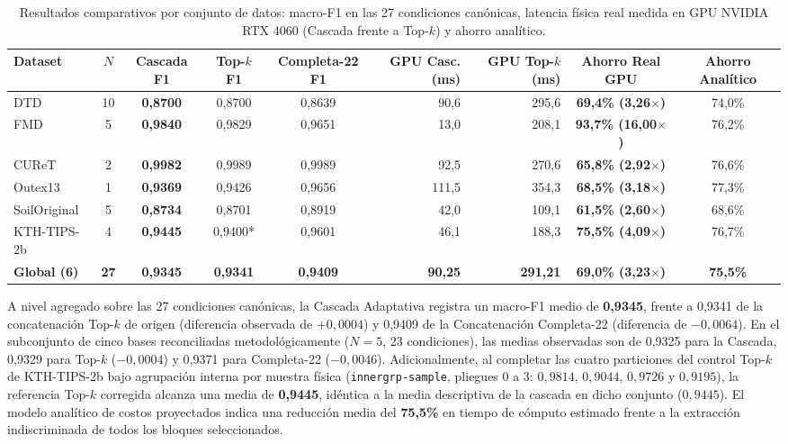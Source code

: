 \begin{table}[!htbp]
\centering
\caption{Resultados comparativos por conjunto de datos: macro-F1 en las 27 condiciones canónicas, latencia física real medida en GPU NVIDIA RTX 4060 (Cascada frente a Top-$k$) y ahorro analítico.}
\label{tab:cascada-multidataset}
\fontsize{7.5}{9.5}\selectfont
\setlength{\tabcolsep}{2.5pt}
\begin{tabular}{@{}lccccrrcc@{}}
\toprule
Dataset & $N$ & Cascada F1 & Top-$k$ F1 & Completa-22 F1 & GPU Casc. (ms) & GPU Top-$k$ (ms) & \textbf{Ahorro Real GPU} & Ahorro Analítico \\
\midrule
DTD & 10 & \textbf{0{,}8700} & 0{,}8700 & 0{,}8639 & 90{,}6 & 295{,}6 & \textbf{69{,}4\% (3{,}26$\times$)} & 74{,}0\% \\
FMD & 5  & \textbf{0{,}9840} & 0{,}9829 & 0{,}9651 & 13{,}0 & 208{,}1 & \textbf{93{,}7\% (16{,}00$\times$)} & 76{,}2\% \\
CUReT & 2 & \textbf{0{,}9982} & 0{,}9989 & 0{,}9989 & 92{,}5 & 270{,}6 & \textbf{65{,}8\% (2{,}92$\times$)} & 76{,}6\% \\
Outex13 & 1 & \textbf{0{,}9369} & 0{,}9426 & 0{,}9656 & 111{,}5 & 354{,}3 & \textbf{68{,}5\% (3{,}18$\times$)} & 77{,}3\% \\
SoilOriginal & 5 & \textbf{0{,}8734} & 0{,}8701 & 0{,}8919 & 42{,}0 & 109{,}1 & \textbf{61{,}5\% (2{,}60$\times$)} & 68{,}6\% \\
\midrule
KTH-TIPS-2b & 4 & \textbf{0{,}9445} & 0{,}9400* & 0{,}9601 & 46{,}1 & 188{,}3 & \textbf{75{,}5\% (4{,}09$\times$)} & 76{,}7\% \\
\midrule
\textbf{Global (6)} & \textbf{27} & \textbf{0{,}9345} & \textbf{0{,}9341} & \textbf{0{,}9409} & \textbf{90{,}25} & \textbf{291{,}21} & \textbf{69{,}0\% (3{,}23$\times$)} & \textbf{75{,}5\%} \\
\bottomrule
\end{tabular}
\end{table}

A nivel agregado sobre las 27 condiciones canónicas, la Cascada Adaptativa registra un macro-F1 medio de \textbf{0{,}9345}, frente a 0{,}9341 de la concatenación Top-$k$ de origen (diferencia observada de $+0{,}0004$) y 0{,}9409 de la Concatenación Completa-22 (diferencia de $-0{,}0064$). En el subconjunto de cinco bases reconciliadas metodológicamente ($N=5$, 23 condiciones), las medias observadas son de 0{,}9325 para la Cascada, 0{,}9329 para Top-$k$ ($-0{,}0004$) y 0{,}9371 para Completa-22 ($-0{,}0046$). Adicionalmente, al completar las cuatro particiones del control Top-$k$ de KTH-TIPS-2b bajo agrupación interna por muestra física (\texttt{innergrp-sample}, pliegues 0 a 3: $0{,}9814$, $0{,}9044$, $0{,}9726$ y $0{,}9195$), la referencia Top-$k$ corregida alcanza una media de \textbf{0{,}9445}, idéntica a la media descriptiva de la cascada en dicho conjunto ($0{,}9445$). El modelo analítico de costos proyectados indica una reducción media del \textbf{75{,}5\%} en tiempo de cómputo estimado frente a la extracción indiscriminada de todos los bloques seleccionados.

